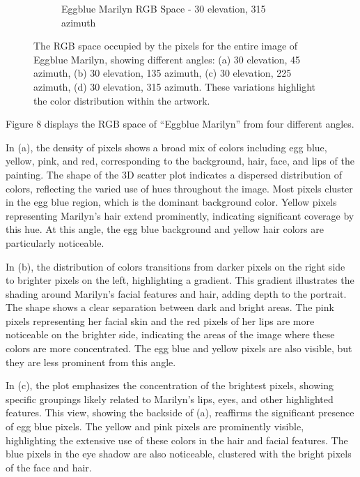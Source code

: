 \documentclass{article}
\begin{document}
\begin{figure}[ht]
\begin{subfigure}{0.45\textwidth}
    \caption{Eggblue Marilyn RGB Space - 30 \degree elevation, 315 \degree azimuth}
    \label{fig:4_20_eggblue_marilyn_original_scatter}
  \end{subfigure}
  \caption{The RGB space occupied by the pixels for the entire image of Eggblue Marilyn, showing different angles: (a) 30 \degree elevation, 45 \degree azimuth, (b) 30 \degree elevation, 135 \degree azimuth, (c) 30 \degree elevation, 225 \degree azimuth, (d) 30 \degree elevation, 315 \degree azimuth. These variations highlight the color distribution within the artwork.}
  \label{fig:eggblue_marilyn_original_scatter_2}
\end{figure}

Figure 8 displays the RGB space of ``Eggblue Marilyn'' from four
different angles.

In (a), the density of pixels shows a broad mix of colors including egg
blue, yellow, pink, and red, corresponding to the background, hair,
face, and lips of the painting. The shape of the 3D scatter plot
indicates a dispersed distribution of colors, reflecting the varied use
of hues throughout the image. Most pixels cluster in the egg blue
region, which is the dominant background color. Yellow pixels
representing Marilyn's hair extend prominently, indicating significant
coverage by this hue. At this angle, the egg blue background and yellow
hair colors are particularly noticeable.

In (b), the distribution of colors transitions from darker pixels on the
right side to brighter pixels on the left, highlighting a gradient. This
gradient illustrates the shading around Marilyn's facial features and
hair, adding depth to the portrait. The shape shows a clear separation
between dark and bright areas. The pink pixels representing her facial
skin and the red pixels of her lips are more noticeable on the brighter
side, indicating the areas of the image where these colors are more
concentrated. The egg blue and yellow pixels are also visible, but they
are less prominent from this angle.

In (c), the plot emphasizes the concentration of the brightest pixels,
showing specific groupings likely related to Marilyn's lips, eyes, and
other highlighted features. This view, showing the backside of (a),
reaffirms the significant presence of egg blue pixels. The yellow and
pink pixels are prominently visible, highlighting the extensive use of
these colors in the hair and facial features. The blue pixels in the eye
shadow are also noticeable, clustered with the bright pixels of the face
and hair.
\end{document}
